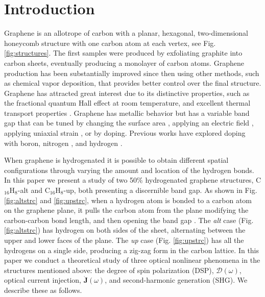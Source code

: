 \documentclass[pss]{wiley2sp} %
\begin{document}
\maketitle


\section{Introduction}\label{sec:intro}

Graphene is an allotrope of carbon with a planar, hexagonal, two-dimensional honeycomb structure with one carbon atom at each vertex, see Fig. \ref{fig:structures}. The first samples were produced by exfoliating graphite into carbon sheets, eventually producing a monolayer of carbon atoms. Graphene production has been substantially improved since then using other methods, such as chemical vapor deposition, that provides better control over the final structure. Graphene has attracted great interest due to its distinctive properties, such as the fractional quantum Hall effect at room temperature, and excellent thermal transport properties \cite{geimNM07,geimNM07,reinaNL08,bottegoniAPL13,balandinNL08}. Graphene has metallic behavior but has a variable band gap that can be tuned by changing the surface area \cite{hanPRL07}, applying an electric field \cite{zhangN09}, applying uniaxial strain \cite{niACSN08}, or by doping. Previous works have explored doping with boron, nitrogen \cite{guoIJ11}, and hydrogen \cite{eliasS09,guisingerNL09,samarakoonACSN10}.

When graphene is hydrogenated it is possible to obtain different spatial configurations through varying the amount and location of the hydrogen bonds. In this paper we present a study of two 50\% hydrogenated graphene structures, C$_{16}$H$_{8}$-alt and C$_{16}$H$_{8}$-up, both presenting a discernible band gap. As shown in Fig. \ref{fig:altstrc} and \ref{fig:upstrc}, when a hydrogen atom is bonded to a carbon atom on the graphene plane, it pulls the carbon atom from the plane modifying the carbon-carbon bond length, and then opening the band gap \cite{samarakoonACSN10}. The \emph{alt} case (Fig. \ref{fig:altstrc}) has hydrogen on both sides of the sheet, alternating between the upper and lower faces of the plane. The \emph{up} case (Fig. \ref{fig:upstrc}) has all the hydrogens on a single side, producing a zig-zag form in the carbon lattice. In this paper we conduct a theoretical study of three optical nonlinear phenomena in the structures mentioned above: the degree of spin polarization (DSP), $\mathcal{D}(\omega)$, optical current injection, $\mathbf{\dot{J}}(\omega)$, and second-harmonic generation (SHG). We describe these as follows.
\end{document}
